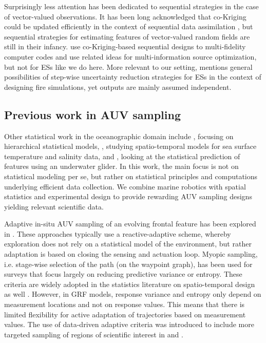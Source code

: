 \documentclass[aoas]{imsart}
\begin{document}
Surprisingly less attention has been dedicated to sequential
strategies in the case of vector-valued observations. It has been long
acknowledged that co-Kriging could be updated efficiently in the
context of sequential data assimilation \citep{Vargas-Guzman1999}, but
sequential strategies for estimating features of vector-valued random
fields are still in their infancy. \cite{LeGratiet.etal2015} use
co-Kriging-based sequential designs to multi-fidelity computer codes
and \cite{Poloczek2017} use related ideas for multi-information
source optimization, but not for ESs like we do here. More relevant
to our setting, \citet[p.82]{stroh} mentions general possibilities of
step-wise uncertainty reduction strategies for ESs in the context of
designing fire simulations, yet outputs are mainly assumed
independent.

\subsection{Previous work in AUV sampling}

Other statistical work in the oceanographic domain include
\cite{wikle2013modern}, focusing on hierarchical statistical models,
\cite{sahu2008space}, studying spatio-temporal models for sea surface
temperature and salinity data, and \cite{mellucci2018oceanic}, looking
at the statistical prediction of features using an underwater glider.
In this work, the main focus is not on statistical modeling per se, but
rather on statistical principles and computations underlying efficient
data collection. We combine marine robotics
with spatial statistics and experimental design to provide rewarding AUV
sampling designs yielding  relevant scientific data.

Adaptive in-situ AUV sampling of an evolving frontal feature has been
explored in \cite{fronts11,Smith2016,Pinto2018,costa19}. These
approaches typically use a reactive-adaptive scheme, whereby
exploration does not rely on a statistical model of the environment,
but rather adaptation is based on closing the sensing and actuation
loop. Myopic sampling, i.e. stage-wise selection of the path (on the
waypoint graph), has been used for surveys
\citep{singh2009efficient,Binney2013} that focus largely on reducing
predictive variance or entropy. These criteria are widely adopted in
the statistics literature on spatio-temporal design as well
\citep{bueso1998state,zidek2019monitoring}. However, in GRF models, response variance and entropy only depend on measurement locations and not on response values. This means that there is limited flexibility for
active adaptation of trajectories based on measurement values. The use
of data-driven adaptive criteria was introduced to include more
targeted sampling of regions of scientific interest in \cite{Low2009}
and \cite{fossuminformation}.
\end{document}
